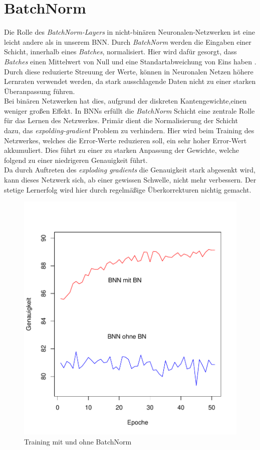 \section{BatchNorm}
Die Rolle des \textit{BatchNorm-Layers} in nicht-binären Neuronalen-Netzwerken ist eine leicht andere als in unserem BNN. Durch \textit{BatchNorm} werden die Eingaben einer Schicht, innerhalb eines \textit{Batches}, normalisiert. Hier wird dafür gesorgt, dass \textit{Batches} einen Mittelwert von Null und eine Standartabweichung von Eins haben\cite{batchnorm} .\\ 
Durch diese reduzierte Streuung der Werte, können in Neuronalen Netzen höhere Lernraten verwendet werden, da stark ausschlagende Daten nicht zu einer starken Überanpassung führen.\\
Bei binären Netzwerken hat dies, aufgrund der diskreten Kantengewichte,einen weniger großen Effekt. In BNNs erfüllt die \textit{BatchNorm} Schicht eine zentrale Rolle für das Lernen des Netzwerkes. Primär dient die Normalisierung der Schicht dazu, das \textit{expolding-gradient} Problem zu verhindern. Hier wird beim Training des Netzwerkes, welches die Error-Werte reduzieren soll, ein sehr hoher Error-Wert akkumuliert. Dies führt zu einer zu starken Anpassung der Gewichte, welche folgend zu einer niedrigeren Genauigkeit führt\cite{DBLP:journals/corr/abs-1909-09139}.\\
 Da durch Auftreten des \textit{exploding gradients} die Genauigkeit stark abgesenkt wird, kann dieses Netzwerk sich, ab einer gewissen Schwelle, nicht mehr verbessern. Der stetige Lernerfolg wird hier durch regelmäßige Überkorrekturen nichtig gemacht.
\begin{figure}[H]
	\centering
	\includegraphics[scale=0.7]{./bilder/_plot_batchnorm}
	\caption{Training mit und ohne BatchNorm}
	\label{fig:bn}
\end{figure}
